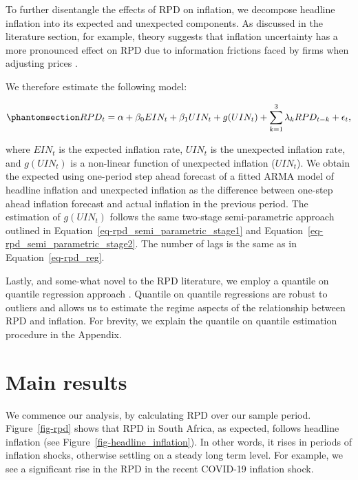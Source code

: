 \documentclass[
  letterpaper,
  DIV=11,
  numbers=noendperiod]{scrartcl}
\begin{document}
To further disentangle the effects of RPD on inflation, we decompose
headline inflation into its expected and unexpected components. As
discussed in the literature section, for example, theory suggests that
inflation uncertainty has a more pronounced effect on RPD due to
information frictions faced by firms when adjusting prices
\citep{lucas1973, hercowitz1981, cukierman1983}.

\newpage

We therefore estimate the following model:

\begin{equation}\phantomsection\label{eq-unexpected}{ RPD_t = \alpha + \beta_0 EIN_t + \beta_1 UIN_t + g(UIN_t) + \sum_{k=1}^{3}\lambda_k RPD_{t-k} + \epsilon_t, }\end{equation}

where \(EIN_t\) is the expected inflation rate, \(UIN_t\) is the
unexpected inflation rate, and \(g(UIN_t)\) is a non-linear function of
unexpected inflation (\(UIN_t\)). We obtain the expected using
one-period step ahead forecast of a fitted ARMA model of headline
inflation and unexpected inflation as the difference between one-step
ahead inflation forecast and actual inflation in the previous period.
The estimation of \(g(UIN_t)\) follows the same two-stage
semi-parametric approach outlined in
Equation~\ref{eq-rpd_semi_parametric_stage1} and
Equation~\ref{eq-rpd_semi_parametric_stage2}. The number of lags is the
same as in Equation~\ref{eq-rpd_reg}.

Lastly, and some-what novel to the RPD literature, we employ a quantile
on quantile regression approach \citep{koenker2017}. Quantile on
quantile regressions are robust to outliers and allows us to estimate
the regime aspects of the relationship between RPD and inflation. For
brevity, we explain the quantile on quantile estimation procedure in the
Appendix.

\section{Main results}\label{main-results}

We commence our analysis, by calculating RPD over our sample period.
Figure~\ref{fig-rpd} shows that RPD in South Africa, as expected,
follows headline inflation (see Figure~\ref{fig-headline_inflation}). In
other words, it rises in periods of inflation shocks, otherwise settling
on a steady long term level. For example, we see a significant rise in
the RPD in the recent COVID-19 inflation shock.
\end{document}
